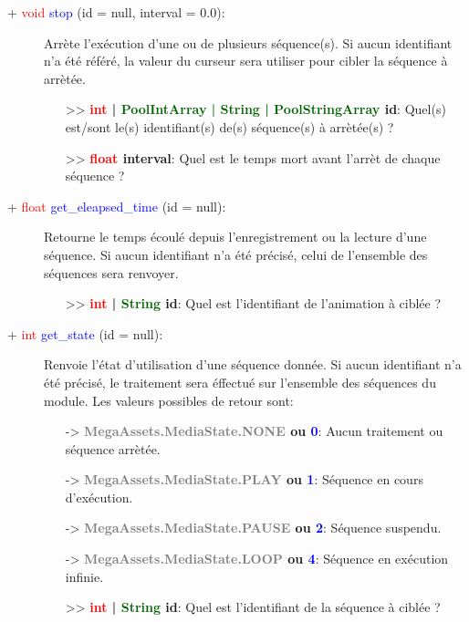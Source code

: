 \documentclass[a4paper, 11pt]{article}
\begin{document}
	\newpage \begin{description}
		\item [+ \textcolor{red}{void} \textcolor{blue}{stop} (id = null, interval = 0.0):] Arrète
		l'exécution d'une ou de plusieurs séquence(s). Si aucun identifiant n'a été référé, la valeur du
		curseur sera utiliser pour cibler la séquence à arrètée.
		\begin{itemize}
			\item [>> \textbf{\textcolor{red}{int} | \textcolor{darkgreen}{PoolIntArray | String |
			PoolStringArray} id}:] Quel(s) est/sont le(s) identifiant(s) de(s) séquence(s) à arrètée(s) ?
			\item [>> \textbf{\textcolor{red}{float} interval}:] Quel est le temps mort avant l'arrèt de 
			chaque séquence ?\\
		\end{itemize}
	\end{description}
	\begin{description}
		\item [+ \textcolor{red}{float} \textcolor{blue}{get\_eleapsed\_time} (id = null):] Retourne le 
		temps écoulé depuis l'enregistrement ou la lecture d'une séquence. Si aucun identifiant n'a été 
		précisé, celui de l'ensemble des séquences sera renvoyer.
		\begin{itemize}
			\item [>> \textbf{\textcolor{red}{int} | \textcolor{darkgreen}{String} id}:] Quel est
			l'identifiant de l'animation à ciblée ?\\
		\end{itemize}
	\end{description}
	\begin{description}
		\item [+ \textcolor{red}{int} \textcolor{blue}{get\_state} (id = null):] Renvoie l'état 
		d'utilisation d'une séquence donnée. Si aucun identifiant n'a été précisé, le traitement sera 
		éffectué sur l'ensemble des séquences du module. Les valeurs possibles de retour sont:
		\begin{itemize}
			\item[-> \textbf{\textcolor{gray}{MegaAssets.MediaState.NONE} ou \textcolor{blue}{0}}:] Aucun
			traitement ou séquence arrètée.
			\item[-> \textbf{\textcolor{gray}{MegaAssets.MediaState.PLAY} ou \textcolor{blue}{1}}:] Séquence 
			en cours d'exécution.
			\item[-> \textbf{\textcolor{gray}{MegaAssets.MediaState.PAUSE} ou \textcolor{blue}{2}}:]
			Séquence suspendu.
			\item[-> \textbf{\textcolor{gray}{MegaAssets.MediaState.LOOP} ou \textcolor{blue}{4}}:] Séquence 
			en exécution infinie.
		\end{itemize}
		\begin{itemize}
			\item [>> \textbf{\textcolor{red}{int} | \textcolor{darkgreen}{String} id}:] Quel est
			l'identifiant de la séquence à ciblée ?\\
		\end{itemize}
	\end{description}
\end{document}

